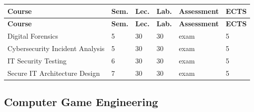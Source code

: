 \documentclass[12pt,a4paper]{article}
\newcommand{\thdrule}{\noalign{\global\setlength{\extrarowheight}{0pt}}}
\newcommand{\thdend}{\noalign{\global\setlength{\extrarowheight}{4pt}}}
\begin{document}
{\scriptsize
\begin{longtable}{m{6.5cm}m{0.7cm}m{1cm}m{1cm}m{1.7cm}m{0.7cm}}
\thdrule\toprule
\rowcolor{pjatkRed}
{\color{white}\footnotesize\textbf{\vphantom{Ag}Course}} & {\color{white}\footnotesize\textbf{\vphantom{Ag}Sem.}} & {\color{white}\footnotesize\textbf{\vphantom{Ag}Lec.}} & {\color{white}\footnotesize\textbf{\vphantom{Ag}Lab.}} & {\color{white}\footnotesize\textbf{\vphantom{Ag}Assessment}} & {\color{white}\footnotesize\textbf{\vphantom{Ag}ECTS}} \\
\midrule\thdend
\endfirsthead
\thdrule\toprule
\rowcolor{pjatkRed}
{\color{white}\footnotesize\textbf{\vphantom{Ag}Course}} & {\color{white}\footnotesize\textbf{\vphantom{Ag}Sem.}} & {\color{white}\footnotesize\textbf{\vphantom{Ag}Lec.}} & {\color{white}\footnotesize\textbf{\vphantom{Ag}Lab.}} & {\color{white}\footnotesize\textbf{\vphantom{Ag}Assessment}} & {\color{white}\footnotesize\textbf{\vphantom{Ag}ECTS}} \\
\midrule\thdend
\endhead
\rowcolor{tableRowLight} Digital Forensics & 5 & 30 & 30 & {\scriptsize exam} & 5 \\
\rowcolor{tableRowAlt} Cybersecurity Incident Analysis & 5 & 30 & 30 & {\scriptsize exam} & 5 \\
\rowcolor{tableRowLight} IT Security Testing & 6 & 30 & 30 & {\scriptsize exam} & 5 \\
\rowcolor{tableRowAlt} Secure IT Architecture Design & 7 & 30 & 30 & {\scriptsize exam} & 5 \\
\bottomrule
\end{longtable}}

\subsection*{Computer Game Engineering}
\end{document}
